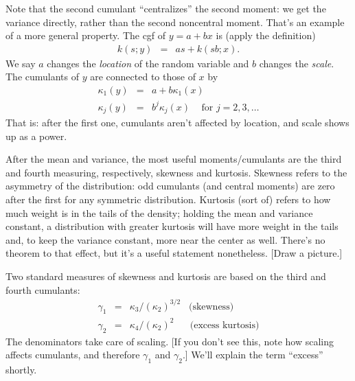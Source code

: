 Note that the second cumulant ``centralizes'' the second moment:
we get the variance directly, rather than the second noncentral moment.
That's an example of a more general property.
The cgf of $y = a+bx$ is (apply the definition)
\begin{eqnarray*}
    k(s; y) &=& a s + k(sb; x) .
\end{eqnarray*}
We say $a$ changes the {\it location\/} of the random variable and
$b$ changes the {\it scale\/}.
The cumulants of $y$ are connected to those of $x$ by
\begin{eqnarray*}
    \kappa_1 (y) &=& a + b \kappa_1 (x) \\
    \kappa_j (y) &=& b^j \kappa_j (x) \;\;\; \mbox{ for } j=2,3,\ldots
\end{eqnarray*}
That is:  after the first one, cumulants aren't affected by location,
and scale shows up as a power.

After the mean and variance, the most useful moments/cumulants
are the third and fourth measuring, respectively,
skewness and kurtosis.
Skewness refers to the asymmetry of the distribution:
odd cumulants (and central moments) are zero after the first
for any symmetric distribution.
Kurtosis (sort of) refers to how much weight is in the tails of the density;
holding the mean and variance constant, a distribution
with greater kurtosis will have more weight in the tails and,
to keep the variance constant, more near the center as well.
There's no theorem to that effect, but it's a useful statement nonetheless.
[Draw a picture.]

Two standard measures of skewness and kurtosis
are based on the third and fourth cumulants:
\begin{eqnarray*}
    \gamma_1 &=& \kappa_3 /(\kappa_2)^{3/2} \;\;\; \mbox{(skewness)}\\
    \gamma_2 &=& \kappa_4 /(\kappa_2)^2 \;\;\;\;\;\; \mbox{(excess kurtosis)}
\end{eqnarray*}
The denominators take care of scaling.
[If you don't see this, note how scaling affects cumulants,
and therefore $\gamma_1$ and $\gamma_2$.]
We'll explain the term ``excess'' shortly.


